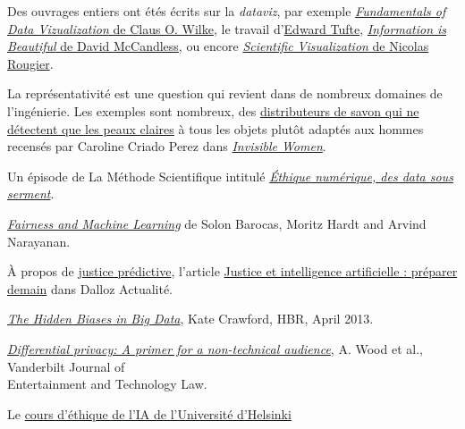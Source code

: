 \begin{plusloin}
\item Des ouvrages entiers ont étés écrits sur la \textit{dataviz}, par exemple \href{https://clauswilke.com/dataviz/}{\textit{Fundamentals of Data Vizualization} de Claus O. Wilke}, le travail d'\href{https://www.edwardtufte.com/tufte/}{Edward Tufte}, \href{https://informationisbeautiful.net/}{\textit{Information is Beautiful} de David McCandless}, ou encore \href{https://github.com/rougier/scientific-visualization-book}{\textit{Scientific Visualization} de Nicolas Rougier}.
\item La représentativité est une question qui revient dans de nombreux
  domaines de l'ingénierie. Les exemples sont nombreux, des
  \href{https://www.huffingtonpost.fr/2017/08/19/ce-distributeur-automatique-ne-distribue-pas-de-savon-aux-mains\_a\_23152387/}{distributeurs
    de savon qui ne détectent que les peaux claires} à tous les
  objets plutôt adaptés aux hommes recensés par Caroline Criado
  Perez dans
  \href{https://www.liberation.fr/france/2020/03/06/les-femmes-invisibles-dans-un-monde-cree-pour-les-hommes\_1780895}{\textit{Invisible
      Women}}.
  \item Un épisode de La Méthode Scientifique  intitulé \href{https://april.org/ethique-numerique-des-datas-sous-serment-emission-la-methode-scientifique}{\textit{Éthique numérique, des data sous
    serment}}.
  \item \href{https://fairmlbook.org/}{\textit{Fairness and Machine Learning}} de Solon
    Barocas, Moritz Hardt and Arvind Narayanan.
  \item À propos de \href{https://www.latribune.fr/supplement/ceux-qui-transforment-la-france/la-justice-predictive-nouvel-outil-pour-les-professionnels-du-droit-837752.html}{justice prédictive}, l'article \href{https://www.dalloz-actualite.fr/flash/justice-et-intelligence-artificielle-preparer-demain-episode-i}{Justice
        et intelligence artificielle : préparer demain} dans Dalloz Actualité.
  \item \href{https://hbr.org/2013/04/the-hidden-biases-in-big-data}{\textit{The Hidden Biases in Big Data}}, Kate Crawford, HBR, April 2013. 
  \item \href{https://salil.seas.harvard.edu/files/salil/files/differential_privacy_primer_nontechnical_audience.pdf}{\textit{Differential privacy: A primer for a non-technical audience}}, A. Wood et al., Vanderbilt Journal of \\Entertainment and Technology Law.
  \item Le \href{https://ethics-of-ai.mooc.fi/start}{cours d'éthique de l'IA de l'Université d'Helsinki}
\end{plusloin}




